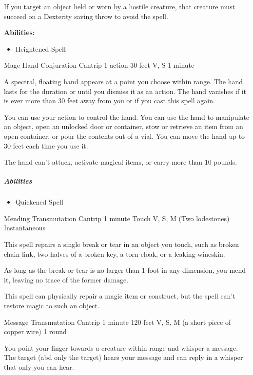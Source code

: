 \documentclass[a4paper,openany,twocolumn]{book}
\begin{document}
If you target an object held or worn by a hostile creature, that creature must succeed on a Dexterity saving throw to avoid the spell.

\textbf{Abilities:}
\begin{itemize}
  \item Heightened Spell
\end{itemize}

\DndSpellHeader
  {Mage Hand}
  {Conjuration Cantrip}
  {1 action}
  {30 feet}
  {V, S}
  {1 minute}

A spectral, floating hand appears at a point you choose within range. The hand lasts for the duration or until you dismiss it as an action. The hand vanishes if it is ever more than 30 feet away from you or if you cast this spell again.
    
You can use your action to control the hand. You can use the hand to manipulate an object, open an unlocked door or container, stow or retrieve an item from an open container, or pour the contents out of a vial. You can move the hand up to 30 feet each time you use it.
    
The hand can't attack, activate magical items, or carry more than 10 pounds.

\subparagraph*{Abilities}
\begin{itemize}
  \item Quickened Spell
\end{itemize}

\DndSpellHeader
  {Mending}
  {Transmutation Cantrip}
  {1 minute}
  {Touch}
  {V, S, M (Two lodestones)}
  {Instantaneous}

This spell repairs a single break or tear in an object you touch, such as broken chain link, two halves of a broken key, a torn cloak, or a leaking wineskin.
    
As long as the break or tear is no larger than 1 foot in any dimension, you mend it, leaving no trace of the former damage.
    
This spell can physically repair a magic item or construct, but the spell can't restore magic to such an object.
    
\DndSpellHeader
  {Message}
  {Transmutation Cantrip}
  {1 minute}
  {120 feet}
  {V, S, M (a short piece of copper wire)}
  {1 round}

  You point your finger towards a creature within range and whisper a message. The target (abd only the target) hears your message and can reply in a whisper that only you can hear.
\end{document}
